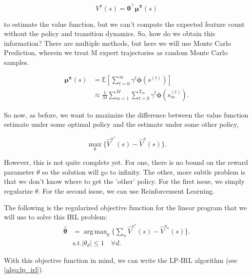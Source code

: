 \documentclass[11pt]{article}
\DeclareMathOperator*{\argmax}{arg\,max}
\DeclareMathOperator*{\maximize}{max}
\begin{document}
\begin{equation}
    V^{\pi}(s) = \boldsymbol{\theta^{\top}}\boldsymbol{\mu^{\pi}}(s)
\end{equation}

to estimate the value function, but we can't compute the expected feature count without the policy and transition dynamics. So, how do we obtain this information? There are multiple methods, but here we will use Monte Carlo Prediction, wherein we treat M expert trajectories as random Monte Carlo samples.

\begin{equation}
\begin{split}
    \boldsymbol{\mu^{\pi}}(s) & = \mathbb{E}[\sum_{t=0}^{\infty} \gamma^t \boldsymbol{\phi}(s^{(t)})] \\
    & \approx \frac{1}{M} \sum_{m=1}^M \sum_{t=0}^{T_m}\gamma^t \boldsymbol{\phi}(s_m^{(t)}).
\end{split}
\end{equation}

So now, as before, we want to maximize the difference between the value function estimate under some optimal policy and the estimate under some other policy,

\begin{equation}
    \maximize_{\theta}\{\hat{V}^{\pi^*}(s) - \hat{V}^{\pi}(s)\}.
\end{equation}

However, this is not quite complete yet. For one, there is no bound on the reward parameter $\theta$ so the solution will go to infinity. The other, more subtle problem is that we don't know where to get the 'other' policy. For the first issue, we simply regularize $\theta$. For the second issue, we can use Reinforcement Learning.

The following is the regularized objective function for the linear program that we will use to solve this IRL problem:
\begin{equation}
        \begin{split}
            \displaystyle \boldsymbol{\hat{\theta}} & =  \argmax_{\theta} \{\sum_{n} \hat{V}^{\pi^*}(s) - \hat{V}^{\pi_n}(s)\}. \\
             & \textrm{s.t.} |\theta_d| \leq 1 \quad \forall d.
        \end{split}
    \end{equation}\label{lp-obj}

With this objective function in mind, we can write the LP-IRL algorithm (see \ref{algo:lp_irl}).
\end{document}
